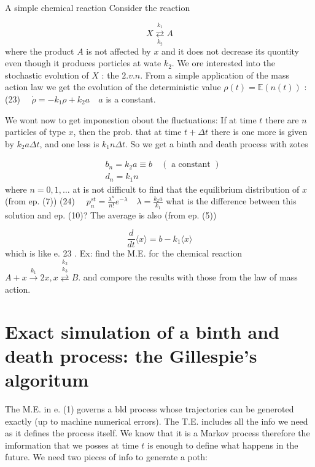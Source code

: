 A simple chemical reaction
Consider the reaction

$$ X \underset{k_{2}}{\stackrel{k_{1}}{\rightleftarrows}} A
$$ 
where the product $A$ is not affected by $x$ and it does not decrease its quontity even though it produces porticles at wate $k_{2}$. We ore interested into the stochastic evolution of $X$ : the $2 . v . n$. From a simple application of the mass action law we get the evolution of the deterministic value $\rho(t)=\mathbb{E}(n(t))$ :
(23) $\quad \dot{\rho}=-k_{1} \rho+k_{2} a \quad a$ is a constant.

We wont now to get imponestion obout the fluctuations: If at time $t$ there are $n$ particles of type $x$, then the prob. that at time $t+\Delta t$ there is one more is given by $k_{2} a \Delta t$, and one less is $k_{1} n \Delta t$. So we get a binth and death process with zotes

$$ 
\begin{aligned}
& b_{n}=k_{2} a \equiv b \quad(\text { a constant }) \\
& d_{n}=k_{1} n
\end{aligned}
$$ 
where $n=0,1, \ldots$
at is not difficult to find that the equilibrium distribution of $x$ (from ep. (7))
(24) $\quad p_{n}^{s t}=\frac{\lambda^{n}}{n!} e^{-\lambda} \quad \lambda=\frac{k_{2}a}{k_{1}}$
what is the difference between this solution and ep. (10)?
The average is also (from ep. (5))

$$ 
\frac{d}{d t}\langle x\rangle=b-k_{1}\langle x\rangle
$$ 
which is like e. 23 .
Ex: find the M.E. for the chemical reaction $A+x \xrightarrow{k_{1}} 2 x, x \stackrel{k_{2}}{\stackrel{k_{3}}{\rightleftarrows}} B$. and compore the results with those from the law of mass action.

\section*{Exact simulation of a binth and death process: the Gillespie's algoritum}
The M.E. in e. (1) governs a bld process whose trajectories can be generoted exactly (up to machine numerical errors). The T.E. includes all the info we need as it defines the process itself. We know that it is a Markov process therefore the imformation that we posses at time $t$ is enough to define what happens in the future.
We need two pieces of info to generate a poth:

